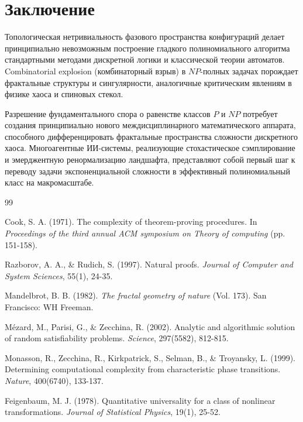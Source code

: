 \documentclass[12pt,a4paper]{article}
\begin{document}
\section{Заключение}

Топологическая нетривиальность фазового пространства конфигураций делает принципиально невозможным построение гладкого полиномиального алгоритма стандартными методами дискретной логики и классической теории автоматов. Combinatorial explosion (комбинаторный взрыв) в $NP$-полных задачах порождает фрактальные структуры и сингулярности, аналогичные критическим явлениям в физике хаоса и спиновых стекол.

Разрешение фундаментального спора о равенстве классов $P$ и $NP$ потребует создания принципиально нового междисциплинарного математического аппарата, способного дифференцировать фрактальные пространства сложности дискретного хаоса. Многоагентные ИИ-системы, реализующие стохастическое сэмплирование и эмерджентную ренормализацию ландшафта, представляют собой первый шаг к переводу задачи экспоненциальной сложности в эффективный полиномиальный класс на макромасштабе.

\clearpage

\begin{thebibliography}{99}

Cook, S. A. (1971). The complexity of theorem-proving procedures. In \textit{Proceedings of the third annual ACM symposium on Theory of computing} (pp. 151-158).

Razborov, A. A., \& Rudich, S. (1997). Natural proofs. \textit{Journal of Computer and System Sciences}, 55(1), 24-35.

Mandelbrot, B. B. (1982). \textit{The fractal geometry of nature} (Vol. 173). San Francisco: WH Freeman.

Mézard, M., Parisi, G., \& Zecchina, R. (2002). Analytic and algorithmic solution of random satisfiability problems. \textit{Science}, 297(5582), 812-815.

Monasson, R., Zecchina, R., Kirkpatrick, S., Selman, B., \& Troyansky, L. (1999). Determining computational complexity from characteristic phase transitions. \textit{Nature}, 400(6740), 133-137.

Feigenbaum, M. J. (1978). Quantitative universality for a class of nonlinear transformations. \textit{Journal of Statistical Physics}, 19(1), 25-52.

\end{thebibliography}
\end{document}
